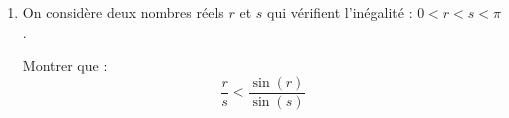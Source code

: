 \documentclass[10pt]{article}
\begin{document}
\begin{enumerate}
\begin{enumerate}
\item Étudier le signe de la fonction $f'$ sur l'intervalle $]0~;~2\pi]$.

\item En déduire le sens de variation de la fonction $f$ sur l'intervalle $]0~;~2\pi]$.

\item Déterminer la limite de $f$ en $0$. On pourra utiliser le taux d'accroissement de la fonction sinus en $0$.
\end{enumerate}

\item On considère deux nombres réels $r$ et $s$ qui vérifient l'inégalité : $0 < r < s < \pi$.

Montrer que :
\[
\dfrac{r}{s}<\dfrac{\sin(r)}{\sin(s)}
\]
\end{enumerate}
\end{document}

